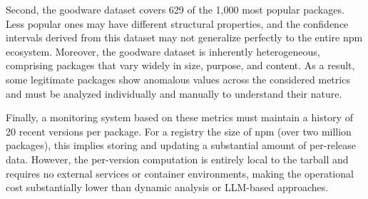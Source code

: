 Second, the goodware dataset covers 629 of the 1,000 most popular packages.
Less popular ones may have different structural properties, 
and the confidence intervals derived from this dataset may not generalize perfectly to the entire \ac{npm} ecosystem.
Moreover, the goodware dataset is inherently heterogeneous, comprising packages that vary widely in size, purpose, and content.
As a result, some legitimate packages show anomalous values across the considered metrics
and must be analyzed individually and manually to understand their nature.

Finally, a monitoring system based on these metrics must maintain a history of 20 recent versions per package.
For a registry the size of \ac{npm} (over two million packages), this implies storing and updating a substantial amount of per-release data.
However, the per-version computation is entirely local to the tarball and requires no external services or container environments,
making the operational cost substantially lower than dynamic analysis or \ac{LLM}-based approaches.